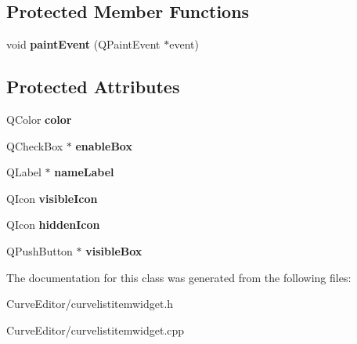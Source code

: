 \subsection*{\-Protected \-Member \-Functions}
\begin{DoxyCompactItemize}
\item 
\hypertarget{class_curve_list_item_widget_ad633dab2786d150f8bb1c34f0e3fac96}{
void {\bfseries paint\-Event} (\-Q\-Paint\-Event $\ast$event)}
\label{class_curve_list_item_widget_ad633dab2786d150f8bb1c34f0e3fac96}

\end{DoxyCompactItemize}
\subsection*{\-Protected \-Attributes}
\begin{DoxyCompactItemize}
\item 
\hypertarget{class_curve_list_item_widget_aeefee356e9d0caf6842e6cdeff24362d}{
\-Q\-Color {\bfseries color}}
\label{class_curve_list_item_widget_aeefee356e9d0caf6842e6cdeff24362d}

\item 
\hypertarget{class_curve_list_item_widget_a38dd3622684411cb1de9fefe36191ae4}{
\-Q\-Check\-Box $\ast$ {\bfseries enable\-Box}}
\label{class_curve_list_item_widget_a38dd3622684411cb1de9fefe36191ae4}

\item 
\hypertarget{class_curve_list_item_widget_a551d99c2947535b18514ebb6a5298a7c}{
\-Q\-Label $\ast$ {\bfseries name\-Label}}
\label{class_curve_list_item_widget_a551d99c2947535b18514ebb6a5298a7c}

\item 
\hypertarget{class_curve_list_item_widget_abff7f8aa4b22355ed73d7fb66475aac7}{
\-Q\-Icon {\bfseries visible\-Icon}}
\label{class_curve_list_item_widget_abff7f8aa4b22355ed73d7fb66475aac7}

\item 
\hypertarget{class_curve_list_item_widget_a04e63c7f56c0f0707c2f12b44601c28c}{
\-Q\-Icon {\bfseries hidden\-Icon}}
\label{class_curve_list_item_widget_a04e63c7f56c0f0707c2f12b44601c28c}

\item 
\hypertarget{class_curve_list_item_widget_a47c47299057662a349ee51607b13a5b7}{
\-Q\-Push\-Button $\ast$ {\bfseries visible\-Box}}
\label{class_curve_list_item_widget_a47c47299057662a349ee51607b13a5b7}

\end{DoxyCompactItemize}


\-The documentation for this class was generated from the following files\-:\begin{DoxyCompactItemize}
\item 
\-Curve\-Editor/curvelistitemwidget.\-h\item 
\-Curve\-Editor/curvelistitemwidget.\-cpp\end{DoxyCompactItemize}
